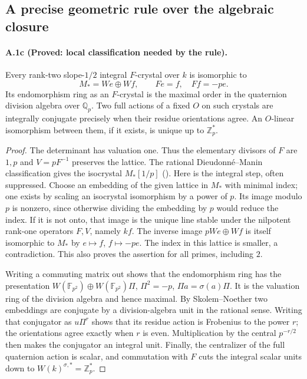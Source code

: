 \subsection{A precise geometric rule over the algebraic closure}

\paragraph{A.1c (Proved: local classification needed by the rule).}
Every rank-two slope-$1/2$ integral $F$-crystal over $k$ is isomorphic to
\[
 M_* =We\oplus Wf,\qquad Fe=f,\quad Ff=-pe.
\]
Its endomorphism ring as an $F$-crystal is the maximal order in the
quaternion division algebra over $\mathbb Q_p$. Two full actions of a
fixed $O$ on such crystals are integrally conjugate precisely when their
residue orientations agree. An $O$-linear isomorphism between them, if
it exists, is unique up to $\mathbb Z_p^*$.

\begin{proof}
The determinant has valuation one. Thus the elementary divisors of $F$
are $1,p$ and $V=pF^{-1}$ preserves the lattice. The rational
Dieudonné--Manin classification gives the isocrystal $M_*[1/p]$
(\citealp[Theorem 5]{Yu2026}). Here is the integral step, often suppressed.
Choose an embedding of the given lattice in $M_*$ with minimal index;
one exists by scaling an isocrystal isomorphism by a power of $p$.
Its image modulo $p$ is nonzero, since otherwise dividing the embedding
by $p$ would reduce the index. If it is not onto, that image is the unique line
stable under the nilpotent rank-one operators $F,V$, namely $kf$.
The inverse image $pWe\oplus Wf$ is itself isomorphic to $M_*$ by
$e\mapsto f$, $f\mapsto-pe$. The index in this lattice is smaller,
a contradiction. This also proves the assertion for all primes,
including $2$.

Writing a commuting matrix out shows that the endomorphism ring has
the presentation $W(\mathbb F_{p^2})\oplus W(\mathbb F_{p^2})\Pi$,
$\Pi^2=-p$, $\Pi a=\sigma(a)\Pi$. It is the valuation ring of the
division algebra and hence maximal. By Skolem--Noether two embeddings
are conjugate by a division-algebra unit in the rational sense. Writing
that conjugator as $u\Pi^r$ shows that its residue action is Frobenius
to the power $r$; the orientations agree exactly when $r$ is even.
Multiplication by the central $p^{-r/2}$ then makes the conjugator an
integral unit. Finally, the centralizer of the full quaternion action
is scalar, and commutation with $F$ cuts the integral scalar units down
to $W(k)^{\sigma,*}=\mathbb Z_p^*$.
\end{proof}

